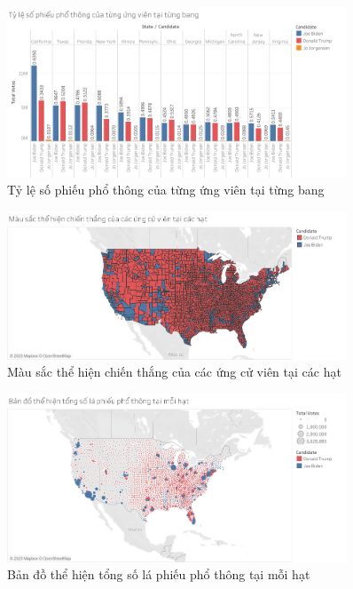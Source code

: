 \documentclass[14pt, a4paper]{article}
\numberwithin{equation}{section}
\numberwithin{figure}{section}
\numberwithin{dl}{section}
\numberwithin{md}{section}
\numberwithin{bd}{section}
\numberwithin{dn}{section}
\numberwithin{hq}{section}
\begin{document}
    \begin{figure}[h!]
        \centering
        \includegraphics[width=0.9\textwidth]{Percentage_Popular_Votes_Candidates_by_States.png}
        \caption{Tỷ lệ số phiếu phổ thông của từng ứng viên tại từng bang}
    \end{figure}

    \begin{figure}[h!]
        \centering
        \includegraphics[width=0.9\textwidth]{County_Candidate_Win.png}
        \caption{Màu sắc thể hiện chiến thắng của các ứng cử viên tại các hạt}
    \end{figure}

    \begin{figure}[h!]
        \centering
        \includegraphics[width=0.9\textwidth]{County_Total_Vote_Circle.png}
        \caption{Bản đồ thể hiện tổng số lá phiếu phổ thông tại mỗi hạt}
    \end{figure}
\end{document}

